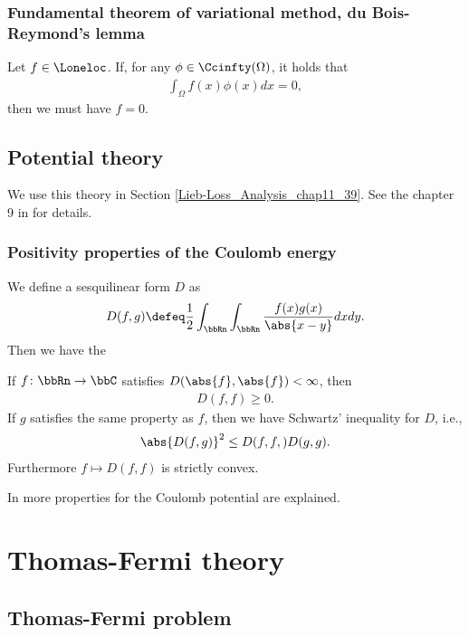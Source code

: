 \documentclass[openany, a4paper, oneside]{jsbook}
\begin{document}
\subsubsection{Fundamental theorem of variational method, du Bois-Reymond's lemma}

\begin{thm}
 Let $f \in \Loneloc$. If, for any $\phi \in \Ccinfty (\Omega)$, it holds that
 \begin{align}
  \int_{\Omega} f (x) \phi (x) dx = 0,
 \end{align}
 then we must have $f = 0$.
\end{thm}
\subsection{Potential theory}

We use this theory in Section \ref{Lieb-Loss_Analysis_chap11_39}.
See the chapter 9 in \cite{LiebLoss1} for details.
\subsubsection{Positivity properties of the Coulomb energy}

We define a sesquilinear form $D$ as
\begin{align}
 D (f, g)
 \defeq
 \frac{1}{2} \int_{\bbRn} \int_{\bbRn} \frac{f (x) g (x)}{\abs{x - y}} dx dy.
\end{align}
Then we have the
\begin{thm}\label{Lieb-Loss_Analysis_chap11_40}
 If $f \colon \bbRn \to \bbC$ satisfies $D ( \abs{f}, \abs{f}) < \infty$, then
\begin{align}
 D (f, f) \geq 0.
\end{align}
If $g$ satisfies the same property as $f$, then we have Schwartz' inequality for $D$, i.e.,
\begin{align}
 \abs{D (f, g)}^2
 \leq
 D (f, f,) D (g, g).
\end{align}
Furthermore $f \mapsto D (f, f)$ is strictly convex.
\end{thm}
In \cite{LiebLoss1} more properties for the Coulomb potential are explained.
\section{Thomas-Fermi theory}

\subsection{Thomas-Fermi problem}
\end{document}
